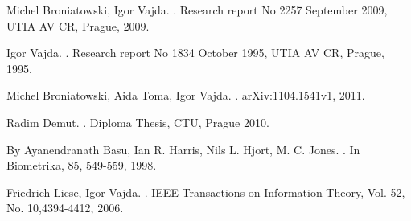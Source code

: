 \begin{thebibliography}{10}

%

Michel Broniatowski, Igor Vajda.
.
\newblock Research report No 2257 September 2009, UTIA AV CR, Prague, 2009.

Igor Vajda.
.
\newblock Research report No 1834 October 1995, UTIA AV CR, Prague, 1995.

Michel Broniatowski, Aida Toma, Igor Vajda.
.
\newblock arXiv:1104.1541v1, 2011.

Radim Demut.
.
\newblock Diploma Thesis, CTU, Prague 2010.

By Ayanendranath Basu, Ian R. Harris, Nils L. Hjort, M. C. Jones.
.
\newblock In Biometrika, 85, 549-559, 1998.

Friedrich Liese, Igor Vajda.
.
\newblock IEEE Transactions on Information Theory, Vol. 52, No. 10,4394-4412, 2006.

\end{thebibliography}